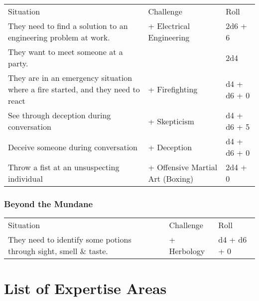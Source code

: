 \documentclass{LegrandOrangeTufteBook}
\begin{document}
\begin{center}
	\begin{xltabular}{\textwidth}{Xll}
		Situation																		& Challenge 												& Roll \\
		They need to find a solution to an engineering problem at work.					&  + Electrical Engineering				& 2d6 + 6 \\
		They want to meet someone at a party.											& 								& 2d4 \\
		They are in an emergency situation where a fire started, and they need to react	&  + Firefighting 			& d4 + d6 + 0 \\
		See through deception during conversation										&  + Skepticism							& d4 + d6 + 5 \\
		Deceive someone during conversation 											&  + Deception						& d4 + d6 + 0 \\
		Throw a fist at an unsuspecting individual										&  + Offensive Martial Art (Boxing)	& 2d4 + 0 \\
	\end{xltabular}
\end{center}

\subsubsection*{Beyond the Mundane}

\begin{center}
	\begin{xltabular}{\textwidth}{Xll}
		Situation												& Challenge 								& Roll \\
		They need to identify some potions through sight, smell \& taste. 				&  + Herbology		& d4 + d6 + 0 \\
	\end{xltabular}
\end{center}

\pagebreak
\section*{List of Expertise Areas}
\end{document}
